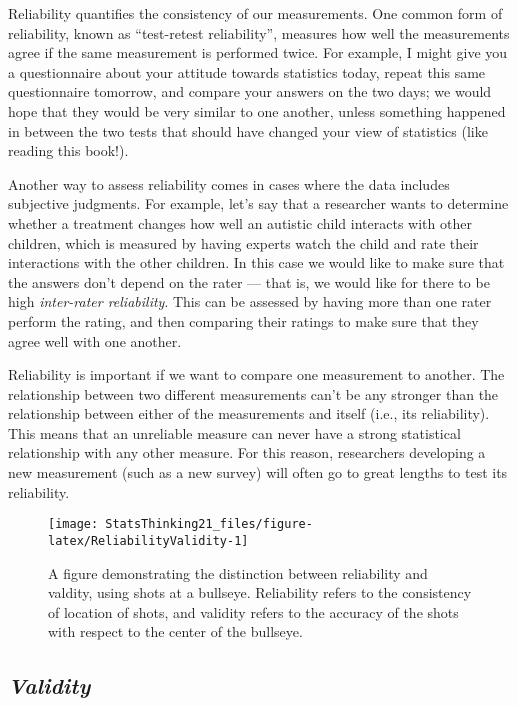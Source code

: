 \documentclass[]{book}
\theoremstyle{definition}
\theoremstyle{definition}
\theoremstyle{definition}
\theoremstyle{remark}
\begin{document}
Reliability quantifies the consistency of our measurements. One common
form of reliability, known as ``test-retest reliability'', measures how
well the measurements agree if the same measurement is performed twice.
For example, I might give you a questionnaire about your attitude
towards statistics today, repeat this same questionnaire tomorrow, and
compare your answers on the two days; we would hope that they would be
very similar to one another, unless something happened in between the
two tests that should have changed your view of statistics (like reading
this book!).

Another way to assess reliability comes in cases where the data includes
subjective judgments. For example, let's say that a researcher wants to
determine whether a treatment changes how well an autistic child
interacts with other children, which is measured by having experts watch
the child and rate their interactions with the other children. In this
case we would like to make sure that the answers don't depend on the
rater --- that is, we would like for there to be high \emph{inter-rater
reliability}. This can be assessed by having more than one rater perform
the rating, and then comparing their ratings to make sure that they
agree well with one another.

Reliability is important if we want to compare one measurement to
another. The relationship between two different measurements can't be
any stronger than the relationship between either of the measurements
and itself (i.e., its reliability). This means that an unreliable
measure can never have a strong statistical relationship with any other
measure. For this reason, researchers developing a new measurement (such
as a new survey) will often go to great lengths to test its reliability.

\begin{figure}
\texttt{[image: StatsThinking21\_files/figure-latex/ReliabilityValidity-1]} \caption{A figure demonstrating the distinction between reliability and valdity, using shots at a bullseye. Reliability refers to the consistency of location of shots, and validity refers to the accuracy of the shots with respect to the center of the bullseye. }\label{fig:ReliabilityValidity}
\end{figure}

\subsection{\texorpdfstring{\emph{Validity}}{Validity}}\label{validity}
\end{document}
